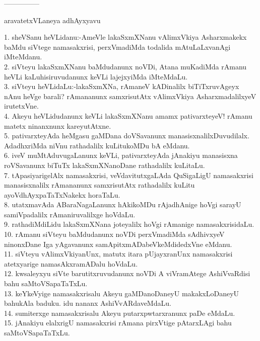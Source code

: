 \documentclass{article}
\begin{document}
\begin{center}
---------------
\end{center}

\begin{center}
aravatetxVLaneya adhAyxyavu
\end{center}

1. sheVSanu heVLidanu:-AmeVle lakaSxmXNanu vAlimxVkiya Asharxmakekx baMdu siVtege namasakxrisi, perxVmadiMda todalida mAtuLaLxvanAgi iMteMdanu.\\
2. siVteyu lakaSxmXNanu baMdudanunx noVDi, Atana muKadiMda rAmanu heVLi kaLuhisiruvudanunx keVLi lajejxyiMda iMteMdaLu.\\
3. siVteyu heVLidaLu:-lakaSxmXNa, rAmaneV kADinalilx biTiTxruvAgeyx nAnu heVge barali? rAmananunx samxrisutAtx vAlimxVkiya AsharxmadalilxyeV irutetxVne.\\
4. Akeyu heVLidudanunx keVLi lakaSxmXNanu amamx pativarxteyeV! rAmanu matetx ninanxnunx kareyutAtxne.\\
5. pativarxteyAda heMgasu gaMDana doVSavanunx manasisxnalilxDuvudilalx. AdadhxriMda niVnu rathadalilx kuLitukoMDu bA eMdanu.\\
6. iveV muMtAduvugaLanunx keVLi, pativarxteyAda jAnakiyu manasisxna roVSavanunx biTuTx lakaSxmXNanoDane rathadalilx kuLitaLu.\\
7. tApasiyarigelAlx namasakxrisi, veVdavitutxgaLAda QuSigaLigU namasakxrisi manasisxnalilx rAmananunx samxrisutAtx rathadalilx kuLitu ayoVdhAyxpaTaTxNakekx horaTaLu.\\
8. utatxmavAda ABaraNagaLanunx hAkikoMDu rAjadhAnige hoVgi sarayU samiVpadalilx rAmaniruvalilxge hoVdaLu.\\
9. rathadiMdiLidu lakaSxmXNana joteyalilx hoVgi rAmanige namasakxrisidaLu.\\
10. rAmanu siVteyu baMdudanunx noVDi perxVmadiMda sAdhivxyeV ninonxDane Iga yAgavanunx samApitxmADabeVkeMdidedxVne eMdanu.\\
11. siVteyu vAlimxVkiyanUnx, matutx itara pUjayxranUnx namasakxrisi atetxyarige namasAkxramADalu hoVdaLu.\\
12. kwsaleyxyu siVte barutitxruvudanunx noVDi A viVramAtege AshiVvaRdisi bahu saMtoVSapaTaTxLu.\\
13. keYkeVyige namasakxrisalu Akeyu gaMDanoDaneyU makakxLoDaneyU bahukAla baduku. idu nananx AshiVvARdaveMdaLu.\\
14. sumiterxge namasakxrisalu Akeyu putarxpwtarxranunx paDe eMdaLu.\\
15. jAnakiyu elalxrigU namasakxrisi rAmana pirxVtige pAtarxLAgi bahu saMtoVSapaTaTxLu.\\
\end{document}
